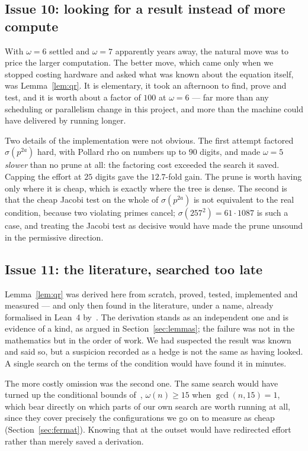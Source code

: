\documentclass[11pt]{amsart}
\theoremstyle{remark}
\begin{document}
\subsection{Issue 10: looking for a result instead of more compute}
With $\omega = 6$ settled and $\omega = 7$ apparently years away, the natural
move was to price the larger computation. The better move, which came only when
we stopped costing hardware and asked what was known about the equation itself,
was Lemma~\ref{lem:qr}. It is elementary, it took an afternoon to find, prove and
test, and it is worth about a factor of $100$ at $\omega = 6$ --- far more than
any scheduling or parallelism change in this project, and more than the machine
could have delivered by running longer.

Two details of the implementation were not obvious. The first attempt factored
$\sigma(p^{2a})$ hard, with Pollard rho on numbers up to $90$ digits, and made
$\omega = 5$ \emph{slower} than no prune at all: the factoring cost exceeded the
search it saved. Capping the effort at $25$ digits gave the $12.7$-fold gain.
The prune is worth having only where it is cheap, which is exactly where the
tree is dense. The second is that the cheap Jacobi test on the whole of
$\sigma(p^{2a})$ is not equivalent to the real condition, because two violating
primes cancel; $\sigma(257^{2}) = 61 \cdot 1087$ is such a case, and treating
the Jacobi test as decisive would have made the prune unsound in the permissive
direction.

\subsection{Issue 11: the literature, searched too late}
Lemma~\ref{lem:qr} was derived here from scratch, proved, tested, implemented and
measured --- and only then found in the literature, under a name, already
formalised in Lean~4 by~\cite{ualbf}. The derivation stands as an independent one
and is evidence of a kind, as argued in Section~\ref{sec:lemmas}; the failure was
not in the mathematics but in the order of work. We had suspected the result was
known and said so, but a suspicion recorded as a hedge is not the same as having
looked. A single search on the terms of the condition would have found it in
minutes.

The more costly omission was the second one. The same search would have turned up
the conditional bounds of~\cite{prasad}, $\omega(n) \ge 15$ when
$\gcd(n,15) = 1$, which bear directly on which parts of our own search are worth
running at all, since they cover precisely the configurations we go on to measure
as cheap (Section~\ref{sec:fermat}). Knowing that at the outset would have
redirected effort rather than merely saved a derivation.
\end{document}
